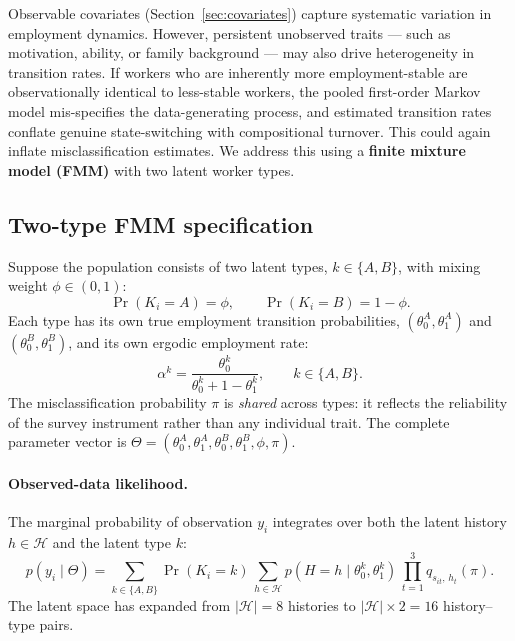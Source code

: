 \documentclass[12pt]{article}
\begin{document}
Observable covariates (Section~\ref{sec:covariates}) capture systematic
variation in employment dynamics. However, persistent unobserved traits
--- such as motivation, ability, or family background --- may also drive
heterogeneity in transition rates. If workers who are inherently more
employment-stable are observationally identical to less-stable workers,
the pooled first-order Markov model mis-specifies the data-generating
process, and estimated transition rates conflate genuine state-switching
with compositional turnover. This could again inflate misclassification
estimates. We address this using a \textbf{finite mixture model (FMM)}
with two latent worker types.

\subsection{Two-type FMM specification}

Suppose the population consists of two latent types,
\(k \in \{A, B\}\), with mixing weight \(\phi \in (0, 1)\):
\[
\Pr(K_i = A) = \phi, \qquad \Pr(K_i = B) = 1 - \phi.
\]
Each type has its own true employment transition probabilities,
\((\theta_0^A, \theta_1^A)\) and \((\theta_0^B, \theta_1^B)\), and its
own ergodic employment rate:
\begin{equation}
\alpha^k = \frac{\theta_0^k}{\theta_0^k + 1 - \theta_1^k}, \qquad
k \in \{A, B\}.
\label{eq:alpha_fmm}
\end{equation}
The misclassification probability \(\pi\) is \emph{shared} across types:
it reflects the reliability of the survey instrument rather than any
individual trait. The complete parameter vector is
\(\Theta = (\theta_0^A, \theta_1^A, \theta_0^B, \theta_1^B, \phi, \pi)\).

\paragraph{Observed-data likelihood.}
The marginal probability of observation \(y_i\) integrates over both
the latent history \(h \in \mathcal{H}\) and the latent type \(k\):
\begin{equation}
p(y_i \mid \Theta) = \sum_{k \in \{A,B\}}
  \Pr(K_i = k)\,
  \sum_{h \in \mathcal{H}}
  p(H = h \mid \theta_0^k, \theta_1^k)\,
  \prod_{t=1}^{3} q_{s_{it},\, h_t}(\pi).
\label{eq:marginal_fmm}
\end{equation}
The latent space has expanded from \(|\mathcal{H}| = 8\) histories to
\(|\mathcal{H}| \times 2 = 16\) history--type pairs.
\end{document}
